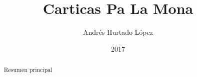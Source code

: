 \documentclass[letterpaper,12pt,spanish,oneside,twocolumn]{article}
\title{Carticas Pa La Mona}
\author{Andrés Hurtado López}
\date{2017}
\begin{document}
\maketitle
\begin{abstract}
Resumen principal
\end{abstract}
\tableofcontents




\end{document}
